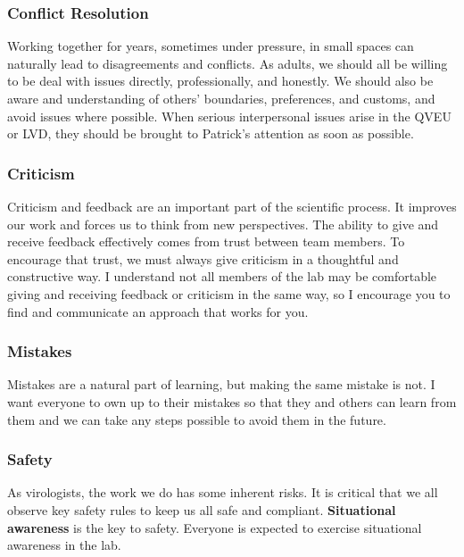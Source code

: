 \documentclass[10pt, letterpaper, twocolumn]{article} %
\begin{document}
\subsubsection{Conflict Resolution}
Working together for years, sometimes under pressure, in small spaces can naturally lead to disagreements and conflicts. As adults, we should all be willing to be deal with issues directly, professionally, and honestly. We should also be aware and understanding of others' boundaries, preferences, and customs, and avoid issues where possible. When serious interpersonal issues arise in the QVEU or LVD, they should be brought to Patrick's attention as soon as possible.

\subsubsection{Criticism}
Criticism and feedback are an important part of the scientific process. It improves our work and forces us to think from new perspectives. The ability to give and receive feedback effectively comes from trust between team members. To encourage that trust, we must always give criticism in a thoughtful and constructive way. I understand not all members of the lab may be comfortable giving and receiving feedback or criticism in the same way, so I encourage you to find and communicate an approach that works for you.

\subsubsection{Mistakes}
Mistakes are a natural part of learning, but making the same mistake is not. I want everyone to own up to their mistakes so that they and others can learn from them and we can take any steps possible to avoid them in the future.

\subsubsection{Safety}
As virologists, the work we do has some inherent risks. It is critical that we all observe key safety rules to keep us all safe and compliant.\newline \newline
{\bfseries Situational awareness} is the key to safety. Everyone is expected to exercise situational awareness in the lab.
\end{document}

